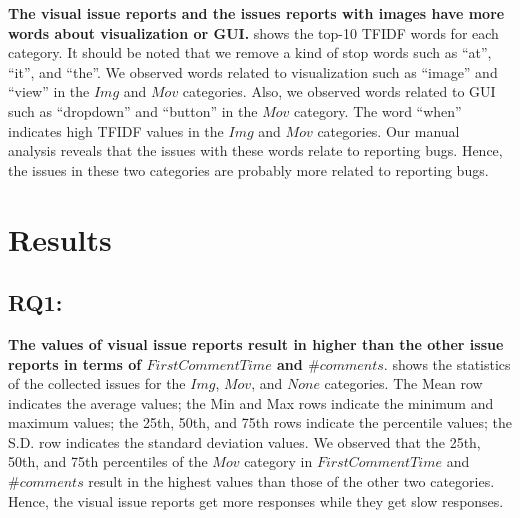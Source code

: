 \textbf{The visual issue reports and the issues 
reports with images have more words 
about visualization or GUI.}
 shows the top-10 TFIDF words
for each category.
It should be noted that we remove a kind of stop words such as 
``at'', ``it'', and ``the''. 
We observed words related to visualization such as 
``image'' and ``view'' in the $Img$ and $Mov$ categories. 
Also, we observed words related to GUI such as 
``dropdown'' and ``button'' in the $Mov$ category. 
The word ``when'' indicates high TFIDF values 
in the $Img$ and $Mov$ categories. 
Our manual analysis reveals that the issues with 
these words relate to reporting bugs. 
Hence, the issues in these two categories are 
probably more related to reporting bugs. 

\section{Results}
\label{sec:results}



% 





\subsection{RQ1: \RQone{}}
\textbf{The values of visual issue reports 
result in higher than the other issue reports 
in terms of $FirstCommentTime$ and $\#comments$}. 
 shows the statistics
of the collected issues for the $Img$, $Mov$,
and $None$ categories.
The Mean row indicates the average values; 
the Min and Max rows indicate the minimum and maximum values; 
the 25th, 50th, and 75th rows indicate the percentile values; 
the S.D. row indicates the standard deviation values. 
We observed that the 25th, 50th, and 75th percentiles of 
the $Mov$ category in $FirstCommentTime$ and $\#comments$ 
result in the highest values than those of 
the other two categories.
Hence, the visual issue reports get more responses 
while they get slow responses. 

